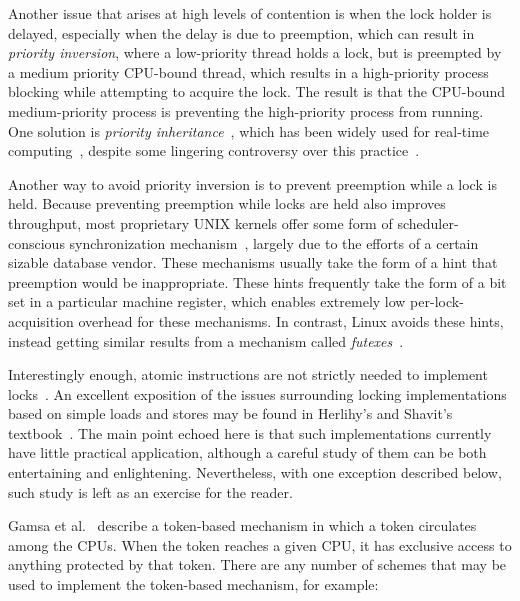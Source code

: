 Another issue that arises at high levels of contention is when the
lock holder is delayed, especially when the delay is due to
preemption, which can result in \emph{priority inversion},
where a low-priority thread holds a lock, but is preempted
by a medium priority CPU-bound thread, which results in
a high-priority process blocking while attempting to acquire the
lock.
The result is that the CPU-bound medium-priority process is preventing the
high-priority process from running.
One solution is \emph{priority inheritance}~\cite{Lampson1980Mesa},
which has been widely used for real-time
computing~\cite{Sha1990IEEETransComp,JonathanCorbet2006PriorityInheritance},
despite some lingering controversy over this
practice~\cite{Yodaiken2004FSM,DougLocke2002a}.

Another way to avoid priority inversion is to prevent preemption
while a lock is held.
Because preventing preemption while locks are held also improves throughput,
most proprietary UNIX kernels offer some form of scheduler-conscious
synchronization mechanism~\cite{Kontothanassis97a},
largely due to the efforts of a certain sizable database vendor.
These mechanisms usually take the form of a hint that preemption
would be inappropriate.
These hints frequently take the form of a bit set in a particular
machine register, which enables extremely low per-lock-acquisition overhead
for these mechanisms.
In contrast, Linux avoids these hints, instead getting
similar results from a mechanism called
\emph{futexes}~\cite{HubertusFrancke2002Futex,IngoMolnar2006RobustFutexes,StevenRostedt2006piFutexes,UlrichDrepper2011Futexes}.

Interestingly enough, atomic instructions are not strictly needed to
implement locks~\cite{Dijkstra65a,Lamport74a}.
An excellent exposition of the issues surrounding locking implementations
based on simple loads and stores may be found in Herlihy's and
Shavit's textbook~\cite{HerlihyShavit2008Textbook}.
The main point echoed here is that such implementations currently
have little practical application, although a careful study of
them can be both entertaining and enlightening.
Nevertheless, with one exception described below, such study is left
as an exercise for the reader.

Gamsa et al.~\cite[Section 5.3]{Gamsa99} describe a token-based
mechanism in which a token circulates among the CPUs.
When the token reaches a given CPU, it has exclusive
access to anything protected by that token.
There are any number of schemes that may be used to implement
the token-based mechanism, for example:

